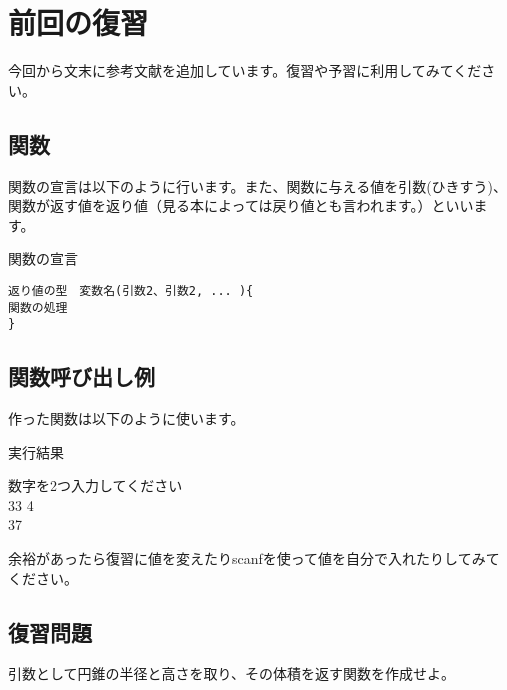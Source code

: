 \section{前回の復習}
今回から文末に参考文献を追加しています。復習や予習に利用してみてください。

\subsection{関数}
関数の宣言は以下のように行います。また、関数に与える値を引数(ひきすう)、関数が返す値を返り値（見る本によっては戻り値とも言われます。）といいます。

\begin{itembox}{関数の宣言}
\begin{verbatim}
返り値の型　変数名(引数2、引数2, ... ){
関数の処理
}
\end{verbatim}
\end{itembox}

\subsection{関数呼び出し例}
作った関数は以下のように使います。

\begin{itembox}{実行結果}

数字を2つ入力してください\\
33 4\\
37
\end{itembox}
余裕があったら復習に値を変えたりscanfを使って値を自分で入れたりしてみてください。
\subsection{復習問題}
引数として円錐の半径と高さを取り、その体積を返す関数を作成せよ。
